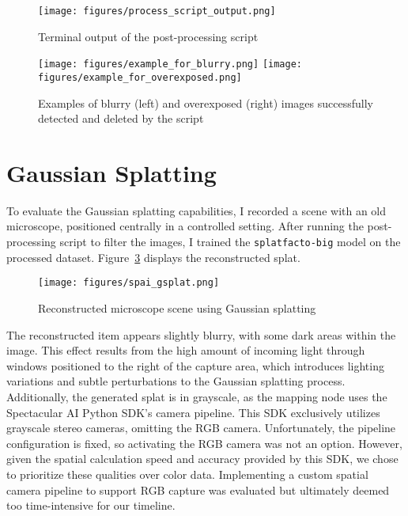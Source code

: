 \begin{figure}[htbp]
	\centering
	\texttt{[image: figures/process\_script\_output.png]}
	\caption{Terminal output of the post-processing script}
	\label{fig:image_process_script_output}
\end{figure}


\begin{figure}[htbp]
	\centering
	\texttt{[image: figures/example\_for\_blurry.png]}\hspace{1cm}
	\texttt{[image: figures/example\_for\_overexposed.png]}\\\vspace{5mm}
	\caption{Examples of blurry (left) and overexposed (right) images successfully detected and deleted by the script}
	\label{fig:blurry_overexposed_example}
\end{figure}
\FloatBarrier

\section{Gaussian Splatting}
To evaluate the Gaussian splatting capabilities, I recorded a scene with an old microscope, positioned centrally in a controlled setting. After running the post-processing script to filter the images, I trained the \verb|splatfacto-big| model on the processed dataset. Figure~\ref{fig:spai_gsplat} displays the reconstructed splat.

\begin{figure}[htbp]
	\centering
	\texttt{[image: figures/spai\_gsplat.png]}
	\caption{Reconstructed microscope scene using Gaussian splatting}
	\label{fig:spai_gsplat}
\end{figure}

The reconstructed item appears slightly blurry, with some dark areas within the image. This effect results from the high amount of incoming light through windows positioned to the right of the capture area, which introduces lighting variations and subtle perturbations to the Gaussian splatting process. Additionally, the generated splat is in grayscale, as the mapping node uses the Spectacular AI Python SDK's camera pipeline. This SDK exclusively utilizes grayscale stereo cameras, omitting the RGB camera. Unfortunately, the pipeline configuration is fixed, so activating the RGB camera was not an option. However, given the spatial calculation speed and accuracy provided by this SDK, we chose to prioritize these qualities over color data. Implementing a custom spatial camera pipeline to support RGB capture was evaluated but ultimately deemed too time-intensive for our timeline.

